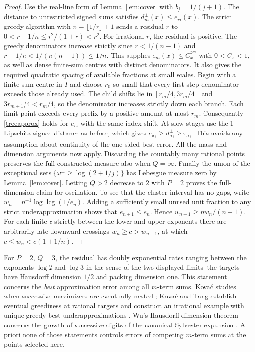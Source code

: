 \documentclass[11pt]{article}
\newcommand{\upexp}{\overline\omega}
\begin{document}
\begin{proof}
Use the real-line form of Lemma~\ref{lem:cover} with $b_j=1/(j+1)$. The distance to unrestricted signed sums satisfies $d_m^\pm(x)\le e_m(x)$. The strict greedy algorithm with $n=\lfloor1/r\rfloor+1$ sends a residual $r$ to $0<r-1/n\le r^2/(1+r)<r^2$. For irrational $r$, the residual is positive. The greedy denominators increase strictly since $r<1/(n-1)$ and $r-1/n<1/(n(n-1))\le1/n$. This supplies $e_m(x)\le C_x^{2^m}$ with $0<C_x<1$, as well as dense finite-sum centres with distinct denominators. It also gives the required quadratic spacing of available fractions at small scales. Begin with a finite-sum centre in $I$ and choose $r_0$ so small that every first-step denominator exceeds those already used. The child shifts lie in $[r_m/4,3r_m/4]$ and $3r_{m+1}/4<r_m/4$, so the denominator increases strictly down each branch. Each limit point exceeds every prefix by a positive amount at most $r_m$. Consequently \eqref{treeapprox} holds for $e_m$ with the same index shift. At slow stages use the 1-Lipschitz signed distance as before, which gives $e_{n_j}\ge d_{n_j}^\pm\ge\tau_{n_j}$. This avoids any assumption about continuity of the one-sided best error. All the mass and dimension arguments now apply. Discarding the countably many rational points preserves the full constructed measure also when $Q=\infty$. Finally the union of the exceptional sets $\{\upexp^\pm\ge\log(2+1/j)\}$ has Lebesgue measure zero by Lemma~\ref{lem:cover}. Letting $Q>2$ decrease to $2$ with $P=2$ proves the full-dimension claim for oscillation. To see that the cluster interval has no gaps, write $w_n=n^{-1}\log\log(1/e_n)$. Adding a sufficiently small unused unit fraction to any strict underapproximation shows that $e_{n+1}\le e_n$. Hence $w_{n+1}\ge n w_n/(n+1)$. For each finite $c$ strictly between the lower and upper exponents there are arbitrarily late downward crossings $w_n\ge c>w_{n+1}$, at which $c\le w_n<c(1+1/n)$.
\end{proof}
For $P=2$, $Q=3$, the residual has doubly exponential rates ranging between the exponents $\log2$ and $\log3$ in the sense of the two displayed limits; the targets have Hausdorff dimension $1/2$ and packing dimension one. This statement concerns the \emph{best} approximation error among all $m$-term sums. Kova\v c studies when successive maximizers are eventually nested \cite{kovac}; Kova\v c and Tang establish eventual greediness at rational targets and construct an irrational example with unique greedy best underapproximations \cite{kt}. Wu's Hausdorff dimension theorem concerns the growth of successive digits of the canonical Sylvester expansion \cite{wu}. A priori none of those statements controls errors of competing $m$-term sums at the points selected here.
\end{document}
